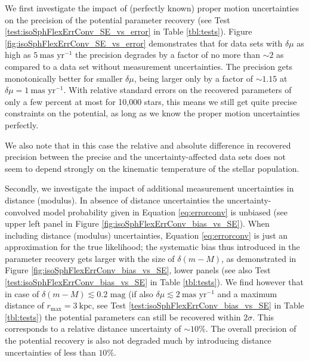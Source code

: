 \documentclass[iop,revtex4]{emulateapj}
\begin{document}
We first investigate the impact of (perfectly known) proper motion uncertainties on the precision of the potential parameter recovery (see Test \ref{test:isoSphFlexErrConv_SE_vs_error} in Table \ref{tbl:tests}). Figure \ref{fig:isoSphFlexErrConv_SE_vs_error} demonstrates that for data sets with $\delta \mu$ as high as $5~\text{mas yr}^{-1}$ the precision degrades by  a factor of no more than $\sim2$ as compared to a data set without measurement uncertainties. The precision gets monotonically better for smaller $\delta \mu$, being larger only by a factor of $\sim 1.15$ at $\delta \mu=1~\text{mas yr}^{-1}$. With relative standard errors on the recovered parameters of only a few percent at most for 10,000 stars, this means we still get quite precise constraints on the potential, as long as we know the proper motion uncertainties perfectly.

We also note that in this case the relative and absolute difference in recovered precision between the precise and the uncertainty-affected data sets does not seem to depend strongly on the kinematic temperature of the stellar population.

Secondly, we investigate the impact of additional measurement uncertainties in distance (modulus). In absence of distance uncertainties the uncertainty-convolved model probability given in Equation \eqref{eq:errorconv} is unbiased (see upper left panel in Figure \ref{fig:isoSphFlexErrConv_bias_vs_SE}).  When including distance (modulus) uncertainties, Equation \eqref{eq:errorconv} is just an approximation for the true likelihood; the systematic bias thus introduced in the parameter recovery gets larger with the size of $\delta (m-M)$, as demonstrated in Figure \ref{fig:isoSphFlexErrConv_bias_vs_SE}, lower panels (see also Test \ref{test:isoSphFlexErrConv_bias_vs_SE} in Table \ref{tbl:tests}).  We find however that in case of $\delta(m-M) \lesssim 0.2 \text{ mag}$ (if also $\delta \mu \lesssim 2 ~\text{mas yr}^{-1}$ and a maximum distance of $r_\text{max} = 3~\text{kpc}$, see Test \ref{test:isoSphFlexErrConv_bias_vs_SE} in Table \ref{tbl:tests}) the potential parameters can still be recovered within $2 \sigma$. This corresponds to a relative distance uncertainty of $\sim10\%$. The overall precision of the potential recovery is also not degraded much by introducing distance uncertainties of less than $10\%$.
\end{document}
